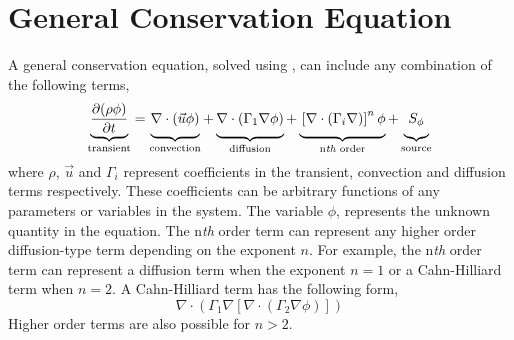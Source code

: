 \section{General Conservation Equation}

A general conservation equation, solved using \FiPy{}, can include any
combination of the following terms,
\begin{equation}                        
  \underbrace{
  \frac{\partial (\rho \phi)}{\partial t}
  }_{\text{transient}}
=
\underbrace{
  \vphantom{\frac{\partial (\rho \phi)}{\partial t}}
  \nabla \cdot \left( \vec{u} \phi \right)
}_{\text{convection}}
+
\underbrace{
  \vphantom{\frac{\partial (\rho \phi)}{\partial t}}
  \nabla \cdot \left( \Gamma_1 \nabla \phi \right) 
}_{\text{diffusion}}
+
\underbrace{
  \vphantom{\frac{\partial (\rho \phi)}{\partial t}}
  \left[ \nabla \cdot \left( \Gamma_i \nabla \right) \right]^n \phi
}_{\text{n\textit{th} order}}
+
\underbrace{
  \vphantom{\frac{\partial (\rho \phi)}{\partial t}}
  S_{\phi}
}_{\text{source}}
\label{eqn:num:gen}
\end{equation}
where $\rho$, $\vec{u}$ and $\Gamma_i$ represent coefficients in the
transient, convection and diffusion terms respectively. These
coefficients can be arbitrary functions of any parameters or variables
in the system. The variable $\phi$, represents the unknown quantity in
the equation. The n\textit{th} order term can represent any higher
order diffusion-type term depending on the exponent $n$. For example,
the n\textit{th} order term can represent a diffusion term when the
exponent $n = 1$ or a Cahn-Hilliard term when $n = 2$. A Cahn-Hilliard
term has the following form,
\begin{equation}
  \nabla \cdot \left( \Gamma_1 \nabla \left[ 
  \nabla \cdot \left( \Gamma_2 \nabla \phi \right) \right] \right)
  \label{eqn:cahn-hilliard}
\end{equation}
Higher order terms are also possible for $n > 2$.



